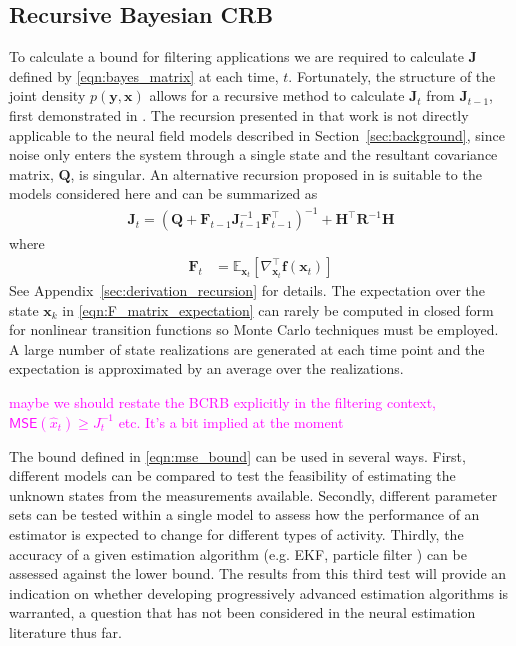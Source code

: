 \documentclass{article}
\renewcommand{\vec}[1]{\ensuremath{{\boldsymbol #1}}}
\newcommand{\unit}[1]{\textcolor{magenta}{#1}}
\begin{document}
\subsection{Recursive Bayesian CRB}
To calculate a bound for filtering applications we are required to calculate $\mathbf{J}$ defined by \eqref{eqn:bayes_matrix} at each time, $t$. Fortunately, the structure of the joint density $p(\mathbf{y},\mathbf{x})$ allows for a recursive method to calculate $\mathbf{J}_t$ from $\mathbf{J}_{t-1}$, first demonstrated in \cite{Tichavsky1998}. The recursion presented in that work is not directly applicable to the neural field models described in Section~\ref{sec:background}, since noise only enters the system through a single state and the resultant covariance matrix, $\mathbf{Q}$, is singular. An alternative recursion proposed in \cite{Bergman2001} is suitable to the models considered here and can be summarized as 
\begin{align}
	\mathbf{J}_t = \left( \mathbf{Q} + {\mathbf{F}}_{t-1} \mathbf{J}_{t-1}^{-1} {\mathbf{F}}_{t-1}^{\top}\right)^{-1} + \mathbf{H}^{\top} \mathbf{R}^{-1} \mathbf{H}
\end{align}
where
\begin{align}
		\mathbf{F}_t &= \mathbb E_{\mathbf{x}_t} \left[ \nabla_{\mathbf{x}_t}^{\top} \vec f(\mathbf{x}_t)\right] 
		\label{eqn:F_matrix_expectation}
\end{align}
See Appendix~\ref{sec:derivation_recursion} for details. The expectation over the state $\vec x_k$ in \eqref{eqn:F_matrix_expectation} can rarely be computed in closed form for nonlinear transition functions so Monte Carlo techniques must be employed. A large number of state realizations are generated at each time point and the expectation is approximated by an average over the realizations.

\unit{maybe we should restate the BCRB explicitly in the filtering context, $\mathsf{MSE}(\hat x_t) \ge J^{-1}_t$ etc. It's a bit implied at the moment}

The bound defined in \eqref{eqn:mse_bound} can be used in several ways. First, different models can be compared to test the feasibility of estimating the unknown states from the measurements available. Secondly, different parameter sets can be tested within a single model to assess how the performance of an estimator is expected to change for different types of activity. Thirdly, the accuracy of a given estimation algorithm (e.g. EKF, particle filter \cite{something}) can be assessed against the lower bound. The results from this third test will provide an indication on whether developing progressively advanced estimation algorithms is warranted, a question that has not been considered in the neural estimation literature thus far.
\end{document}
